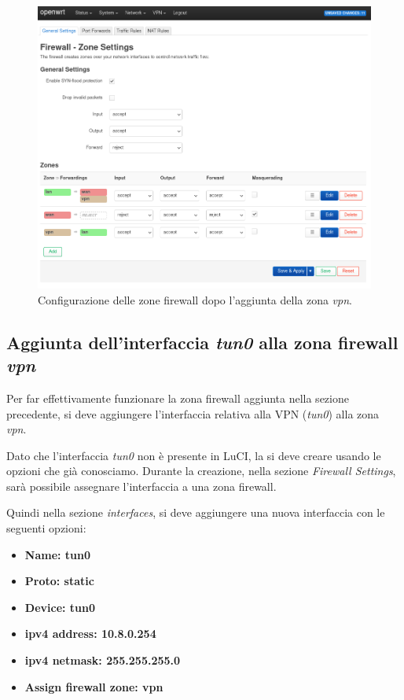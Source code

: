 \begin{figure}[H]
    \centering
    \includegraphics[width=1\linewidth]{immagini/LuCI_firewall_end1}
    \caption{Configurazione delle zone firewall dopo l'aggiunta della zona \textit{vpn}.}
    \label{fig:luci-firewall-end}
\end{figure}

\subsection{Aggiunta dell'interfaccia \textit{tun0} alla zona firewall \textit{vpn} \ok}
\label{subsec:aggiunta-interfaccia-tun0-zona-vpn}

Per far effettivamente funzionare la zona firewall aggiunta nella sezione precedente, si deve aggiungere l'interfaccia relativa alla VPN (\textit{tun0}) alla zona \textit{vpn}.

Dato che l'interfaccia \textit{tun0} non è presente in LuCI, la si deve creare usando le opzioni che già conosciamo. Durante la creazione, nella sezione \textit{Firewall Settings}, sarà possibile assegnare l'interfaccia a una zona firewall.

Quindi nella sezione \textit{interfaces}, si deve aggiungere una nuova interfaccia con le seguenti opzioni:

\begin{itemize}[nosep]
    \item \bf{Name}: tun0
    \item \bf{Proto}: static
    \item \bf{Device}: tun0
    \item \bf{ipv4 address}: 10.8.0.254
    \item \bf{ipv4 netmask}: 255.255.255.0
    \item \bf{Assign firewall zone}: vpn
\end{itemize}

